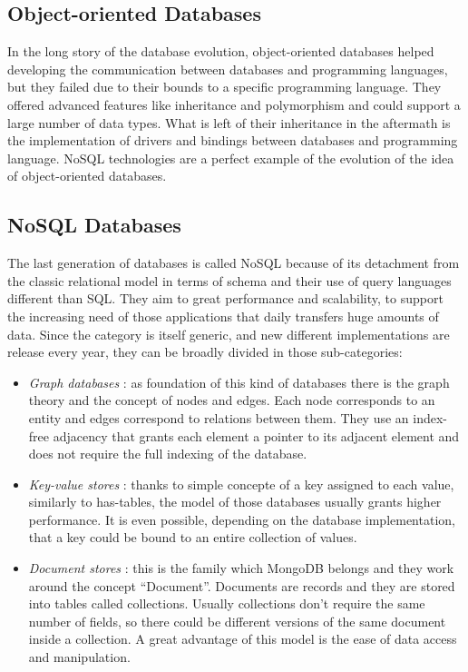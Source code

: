 \subsection{Object-oriented Databases}
In the long story of the database evolution, object-oriented databases helped developing the communication between databases and programming languages, but they failed due to their bounds to a specific programming language. They offered advanced features like inheritance and polymorphism and could support a large number of data types.
What is left of their inheritance in the aftermath is the implementation of drivers and bindings between databases and programming language.
NoSQL technologies are a perfect example of the evolution of the idea of object-oriented databases.

\subsection{NoSQL Databases}
The last generation of databases is called NoSQL because of its detachment from the classic relational model in terms of schema and their use of query languages different  than SQL.
They  aim to great performance and scalability, to support the increasing need of those applications that daily transfers huge amounts of data.
Since the category is itself generic, and new different implementations are release every year, they can be broadly divided in those sub-categories:
\begin{itemize}
	\item \textit{Graph databases} : as foundation of this kind of databases there is the graph theory and the concept of nodes and edges. Each node corresponds to an entity and edges correspond to relations between them. They use an index-free adjacency that grants each element a pointer to its adjacent element and does not require the full indexing of the database.
	\item \textit{Key-value stores} : thanks to simple concepte of a key assigned to each value, similarly to has-tables, the model of those databases usually grants higher performance. It is even possible, depending on the database implementation, that a key could be bound to an entire collection of values.
	\item \textit{Document stores} : this is the family which MongoDB belongs and they work around the concept “Document”. Documents are records and they are stored into tables called collections. Usually collections don’t require the same number of fields, so there could be different versions of the same document inside a collection. A great advantage of this model is the ease of data access and manipulation.
\end{itemize}
